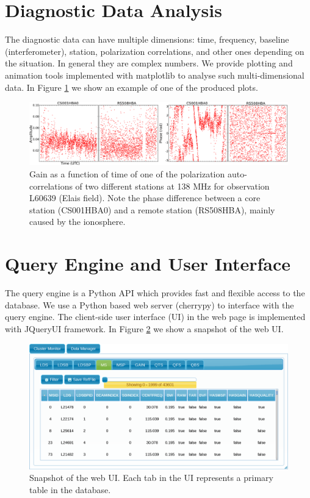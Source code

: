 \section{Diagnostic Data Analysis}
The diagnostic data can have multiple dimensions: time, frequency, baseline (interferometer), station, polarization correlations, and other ones depending on the situation. In general they are complex numbers. We provide plotting and animation tools implemented with matplotlib to analyse such multi-dimensional data. In Figure \ref{fig:gain} we show an example of one of the produced plots.
\begin{figure}[!ht]
  \centering
    \includegraphics[scale=0.19]{part10/Martinez-rubi_O23/O23_f2.eps} 
  \caption{Gain as a function of time of one of the polarization auto-correlations of two different stations at 138 MHz for observation L60639 (Elais field). Note the phase difference between a core station (CS001HBA0) and a remote station (RS508HBA), mainly caused by the ionosphere.}
  \label{fig:gain}
\end{figure}

\section{Query Engine and User Interface}

The query engine is a Python API which provides fast and flexible access to the database. We use a Python based web server (cherrypy) to interface with the query engine. The client-side user interface (UI) in the web page is implemented with JQueryUI framework. In Figure \ref{fig:webui} we show a snapshot of the web UI.
\begin{figure}[!ht]
  \centering
    \includegraphics[scale=0.24]{part10/Martinez-rubi_O23/O23_f3.eps} 
  \caption{Snapshot of the web UI. Each tab in the UI represents a primary table in the database.}
  \label{fig:webui}
\end{figure}

